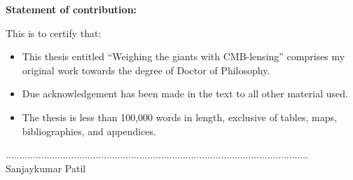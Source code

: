 


\bfseries{Statement of contribution:}\mdseries\\
\vspace{1.0cm}

This is to certify that:\\

\begin{itemize}

\item This thesis entitled ``Weighing the giants with CMB-lensing'' comprises my  original work towards the degree of Doctor of Philosophy.

\item Due acknowledgement has been made in the text to all other material used.

\item The thesis is less than 100,000 words in length, exclusive of tables, maps, bibliographies, and appendices.

\end{itemize}

\vspace{4.0cm}


\scriptsize{...............................................................................................................}\normalsize\\

      					 Sanjaykumar Patil\\
